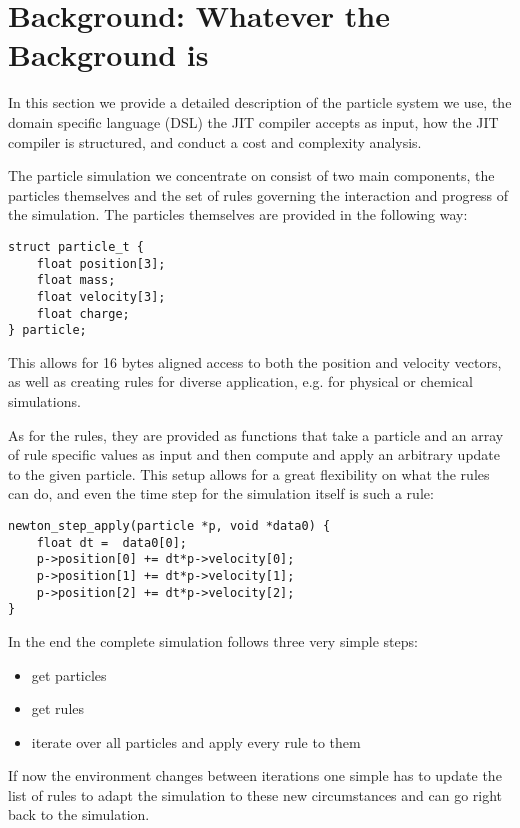 \section{Background: Whatever the Background is}\label{sec:background}

In this section we provide a detailed description of the particle system we use, the domain specific language (DSL) the JIT compiler accepts as input, how the JIT compiler is structured, and conduct a cost and complexity analysis.

The particle simulation we concentrate on consist of two main components, the particles themselves and the set of rules governing the interaction and progress of the simulation. The particles themselves are provided in the following way:
\begin{lstlisting}
struct particle_t {
    float position[3];
    float mass;
    float velocity[3];
    float charge;
} particle;
\end{lstlisting} 

This allows for 16 bytes aligned access to both the position and velocity vectors, as well as creating rules for diverse application, e.g. for physical or chemical simulations.

As for the rules, they are provided as functions that take a particle and an array of rule specific values as input and then compute and apply an arbitrary update to the given particle. This setup allows for a great flexibility on what the rules can do, and even the time step for the simulation itself is such a rule:

\begin{lstlisting}
newton_step_apply(particle *p, void *data0) {
    float dt =  data0[0];
    p->position[0] += dt*p->velocity[0];
    p->position[1] += dt*p->velocity[1];
    p->position[2] += dt*p->velocity[2];
}
\end{lstlisting}

In the end the complete simulation follows three very simple steps:
\begin{itemize}
\item get particles
\item get rules
\item iterate over all particles and apply every rule to them
\end{itemize}

If now the environment changes between iterations one simple has to update the list of rules to adapt the simulation to these new circumstances and can go right back to the simulation.

